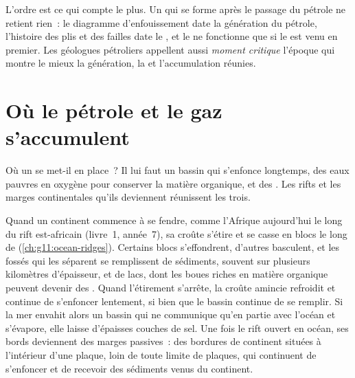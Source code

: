 L'ordre est ce qui compte le plus. Un  qui se forme après le passage du
pétrole ne retient rien~: le diagramme d'enfouissement date la génération
du pétrole, l'histoire des plis et des failles date le , et le  ne fonctionne que si le  est venu en premier. Les géologues
pétroliers appellent aussi \emph{moment critique} l'époque qui montre le
mieux la génération, la  et l'accumulation réunies.

\section{Où le pétrole et le gaz s'accumulent}

Où un  se met-il en place~? Il lui faut un bassin qui
s'enfonce longtemps, des eaux pauvres en oxygène pour conserver la matière
organique, et des . Les rifts et les marges continentales qu'ils
deviennent réunissent les trois.

Quand un continent commence à se fendre, comme l'Afrique aujourd'hui le
long du rift est-africain (livre~1, année~7), sa croûte s'étire et se
casse en blocs le long de  (\cref{ch:g11:ocean-ridges}).
Certains blocs s'effondrent, d'autres basculent, et les fossés qui les
séparent se remplissent de sédiments, souvent sur plusieurs kilomètres
d'épaisseur, et de lacs, dont les boues riches en matière organique peuvent
devenir des . Quand l'étirement s'arrête, la croûte amincie
refroidit et continue de s'enfoncer lentement, si bien que le bassin
continue de se remplir. Si la mer envahit alors un bassin qui ne
communique qu'en partie avec l'océan et s'évapore, elle laisse d'épaisses
couches de sel. Une fois le rift ouvert en océan, ses bords deviennent des
marges passives~: des bordures de continent situées à l'intérieur d'une
plaque, loin de toute limite de plaques, qui continuent de s'enfoncer et de
recevoir des sédiments venus du continent.

